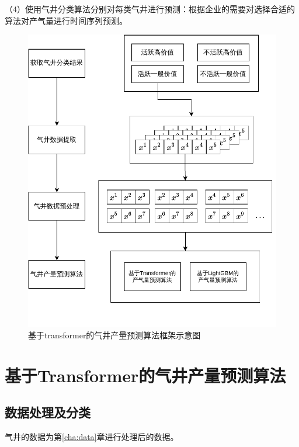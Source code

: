 （4）使用气井分类算法分别对每类气井进行预测：根据企业的需要对选择合适的算法对产气量进行时间序列预测。
\begin{figure}[h]
    \centering
    \includegraphics{figure/第四章框架图.vision.pdf}
    \caption{基于transformer的气井产量预测算法框架示意图}
    \label{fig:TFTprogess}
\end{figure}

\section{基于Transformer的气井产量预测算法}

\subsection{数据处理及分类}
\label{sec:datafoc}
气井的数据为第\ref{cha:data}章进行处理后的数据。

